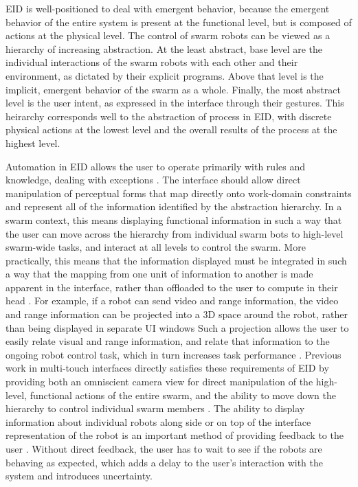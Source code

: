 \documentclass[]{article}
\begin{document}
EID is well-positioned to deal with emergent behavior, because the emergent behavior of the entire system is present at the functional level, but is composed of actions at the physical level.  
The control of swarm robots can be viewed as a hierarchy of increasing abstraction. 
At the least abstract, base level are the individual interactions of the swarm robots with each other and their environment, as dictated by their explicit programs. 
Above that level is the implicit, emergent behavior of the swarm as a whole. 
Finally, the most abstract level is the user intent, as expressed in the interface through their gestures. 
This heirarchy corresponds well to the abstraction of process in EID, with discrete physical actions at the lowest level and the overall results of the process at the highest level. 

Automation in EID allows the user to operate primarily with rules and knowledge, dealing with exceptions \cite{vicente2002ecological}.
The interface should allow direct manipulation of perceptual forms that map directly onto work-domain constraints and represent all of the information identified by the abstraction hierarchy. 
In a swarm context, this means displaying functional information in such a way that the user can move across the hierarchy from individual swarm bots to high-level swarm-wide tasks, and interact at all levels to control the swarm. 
More practically, this means that the information displayed must be integrated in such a way that the mapping from one unit of information to another is made apparent in the interface, rather than offloaded to the user to compute in their head \cite{yanco2004beyond}. 
For example, if a robot can send video and range information, the video and range information can be projected into a 3D space around the robot, rather than being displayed in separate UI windows 
Such a projection allows the user to easily relate visual and range information, and relate that information to the ongoing robot control task, which in turn increases task performance \cite{ricks2004ecological}.
Previous work in multi-touch interfaces directly satisfies these requirements of EID by providing both an omniscient camera view for direct manipulation of the high-level, functional actions of the entire swarm, and the ability to move down the hierarchy to control individual swarm members \cite{Micire:2009:ANG:1731903.1731912}.
The ability to display information about individual robots along side or on top of the interface representation of the robot is an important method of providing feedback to the user \cite{Kato:2009:MIC:1520340.1520500}. 
Without direct feedback, the user has to wait to see if the robots are behaving as expected, which adds a delay to the user's interaction with the system and introduces uncertainty. 
\end{document}
